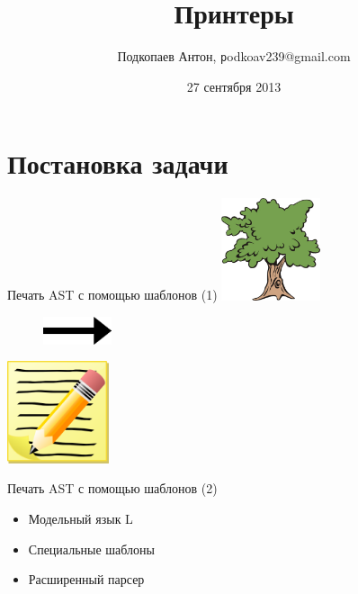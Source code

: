 \documentclass[sans]{beamer}
\begin{document}
\title    [Принтеры] {Принтеры}



\author
[Подкопаев Антон]{Подкопаев Антон, \texttt podkoav239@gmail.com}
\date [27-09-13]{27 сентября 2013}

\begin{frame}[plain]
	\titlepage
\end{frame}

\section{Постановка задачи}

\begin{frame}{Печать AST с помощью шаблонов (1)}
	\includegraphics[height = 3cm]{images/tree.jpg}
	\begin{figure}
		\includegraphics[width = 2cm]{images/arrow.png}
	\end{figure}

	\hfill
	\includegraphics[height = 3cm]{images/text.png}
\end{frame}

\begin{frame}{Печать AST с помощью шаблонов (2)}
	\begin{itemize}
		\item Модельный язык L
		\item Специальные шаблоны
		\item Расширенный парсер
	\end{itemize}
	\begin{block}{}
		\inputminted{pascal}{codes/l_write.t}
	\end{block}
\end{frame}
\end{document}
